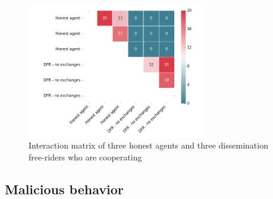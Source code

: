 \begin{figure}[h!]
    \centering
    \includegraphics[width=0.7\textwidth]{images/50percent_interaction_matrix}
    \caption{Interaction matrix of three honest agents and three dissemination free-riders who are cooperating}
    \label{fig:50percent}
\end{figure}

\subsection{Malicious behavior}

